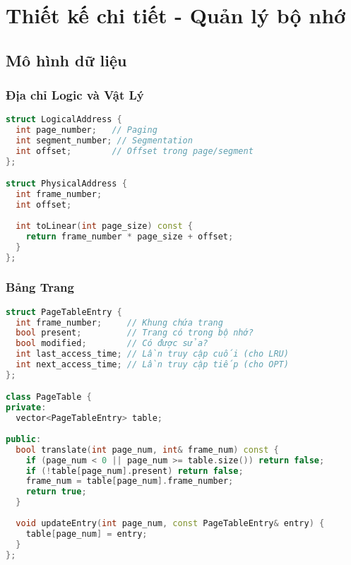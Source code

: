 
\chapter{Thiết kế chi tiết - Quản lý bộ nhớ}
\label{ch:memory_detail}

\section{Mô hình dữ liệu}

\subsection{Địa chỉ Logic và Vật Lý}

\begin{lstlisting}[language=C++,caption={Địa chỉ Logic và Vật lý}]
struct LogicalAddress {
  int page_number;   // Paging
  int segment_number; // Segmentation
  int offset;        // Offset trong page/segment
};

struct PhysicalAddress {
  int frame_number;
  int offset;
  
  int toLinear(int page_size) const {
    return frame_number * page_size + offset;
  }
};
\end{lstlisting}

\subsection{Bảng Trang}

\begin{lstlisting}[language=C++,caption={Page Table}]
struct PageTableEntry {
  int frame_number;     // Khung chứa trang
  bool present;         // Trang có trong bộ nhớ?
  bool modified;        // Có được sửa?
  int last_access_time; // Lần truy cập cuối (cho LRU)
  int next_access_time; // Lần truy cập tiếp (cho OPT)
};

class PageTable {
private:
  vector<PageTableEntry> table;
  
public:
  bool translate(int page_num, int& frame_num) const {
    if (page_num < 0 || page_num >= table.size()) return false;
    if (!table[page_num].present) return false;
    frame_num = table[page_num].frame_number;
    return true;
  }
  
  void updateEntry(int page_num, const PageTableEntry& entry) {
    table[page_num] = entry;
  }
};
\end{lstlisting}

